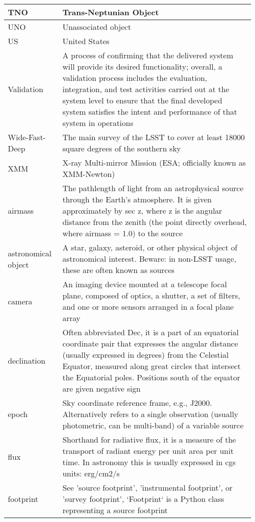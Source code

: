 \begin{longtable}{|p{}|p{}|}
TNO & Trans-Neptunian \gls{Object} \\\hline
UNO & Unassociated object \\\hline
US & United States \\\hline
Validation & A process of confirming that the delivered system will provide its desired functionality; overall, a validation process includes the evaluation, integration, and test activities carried out at the system level to ensure that the final developed system satisfies the intent and performance of that system in operations \\\hline
Wide-Fast-Deep & The main survey of the \gls{LSST} to cover at least 18000 square degrees of the southern sky \\\hline
XMM & X-ray Multi-mirror Mission (\gls{ESA}; officially known as \gls{XMM}-Newton) \\\hline
airmass & The pathlength of light from an astrophysical source through the Earth's atmosphere. It is given approximately by sec z, where z is the angular distance from the zenith (the point directly overhead, where \gls{airmass} = 1.0) to the source \\\hline
astronomical object & A star, galaxy, asteroid, or other physical object of astronomical interest. Beware: in non-LSST usage, these are often known as sources \\\hline
camera & An imaging device mounted at a telescope focal plane, composed of optics, a shutter, a set of filters, and one or more sensors arranged in a focal plane array \\\hline
declination & Often abbreviated Dec, it is a part of an equatorial coordinate pair that expresses the angular distance (usually expressed in degrees) from the Celestial Equator, measured along great circles that intersect the Equatorial poles. Positions south of the equator are given negative sign \\\hline
epoch & Sky coordinate reference frame, e.g., J2000. Alternatively refers to a single observation (usually photometric, can be multi-band) of a variable source \\\hline
flux & Shorthand for radiative \gls{flux}, it is a measure of the transport of radiant energy per unit area per unit time. In astronomy this is usually expressed in cgs units: erg/cm2/s \\\hline
footprint & See 'source footprint', 'instrumental footprint', or 'survey footprint', `Footprint` is a Python class representing a \gls{source footprint} \\\hline

\end{longtable}
